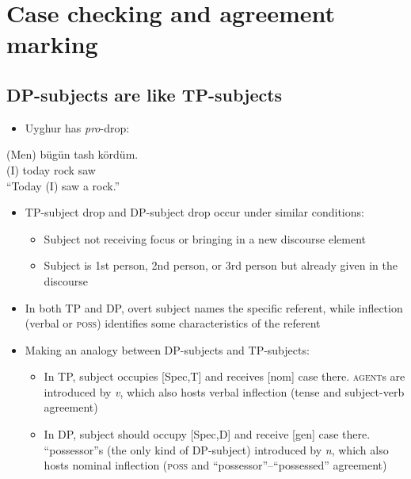 \documentclass[letterpaper,12pt]{article}
\newcommand{\posst}{\textsc{poss}}
\begin{document}
\section{\Large{Case checking and agreement marking}}
\subsection{DP-subjects are like TP-subjects}
\begin{itemize}
\item Uyghur has \emph{pro}-drop:
\end{itemize}
\begin{exe}
\ex \gll (Men) b\"ug\"un tash k\"ord\"um.\\
				 (I) today rock saw\\
		\glt ``Today (I) saw a rock.''
\end{exe}
\begin{itemize}
\item TP-subject drop and DP-subject drop occur under similar conditions:
	\begin{itemize}
	\item Subject not receiving focus or bringing in a new discourse element
	\item Subject is 1st person, 2nd person, or 3rd person but already given in the discourse
	\end{itemize}
\item In both TP and DP, overt subject names the specific referent, while inflection (verbal or \posst) identifies some characteristics of the referent
\item Making an analogy between DP-subjects and TP-subjects:
	\begin{itemize}
	\item In TP, subject occupies [Spec,T] and receives [nom] case there. \textsc{agent}s are introduced by \emph{v}, which also hosts verbal inflection (tense and subject-verb agreement)
	\item In DP, subject should occupy [Spec,D] and receive [gen] case there. ``possessor''s (the only kind of DP-subject) introduced by \emph{n}, which also hosts nominal inflection (\posst{} and ``possessor''--``possessed'' agreement)
	\end{itemize}
\end{itemize}
\end{document}
